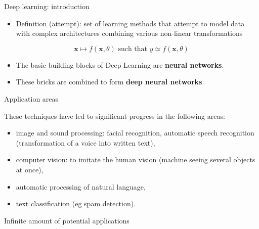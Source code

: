 \documentclass[ignorenonframetext,]{beamer}
\providecommand{\tightlist}{%
  \setlength{\itemsep}{0pt}\setlength{\parskip}{0pt}}
\begin{document}
\begin{frame}{Deep learning: introduction}
\protect\hypertarget{deep-learning-introduction}{}

\begin{itemize}
\tightlist
\item
  Definition (attempt): set of learning methods that attempt to model
  data with complex architectures combining various non-linear
  transformations
\end{itemize}

\[ \mathbf{x} \mapsto f(\mathbf{x},\theta) \mbox{ such that } y \simeq f(\mathbf{x},\theta)\]

\begin{itemize}
\tightlist
\item
  The basic building blocks of Deep Learning are \textbf{neural
  networks}.
\item
  These bricks are combined to form \textbf{deep neural networks}.
\end{itemize}

\end{frame}

\begin{frame}{Application areas}
\protect\hypertarget{application-areas}{}

These techniques have led to significant progress in the following
areas:

\begin{itemize}
\tightlist
\item
  image and sound processing: facial recognition, automatic speech
  recognition (transformation of a voice into written text),
\item
  computer vision: to imitate the human vision (machine seeing several
  objects at once),
\item
  automatic processing of natural language,
\item
  text classification (eg spam detection).
\end{itemize}

Infinite amount of potential applications

\end{frame}
\end{document}

